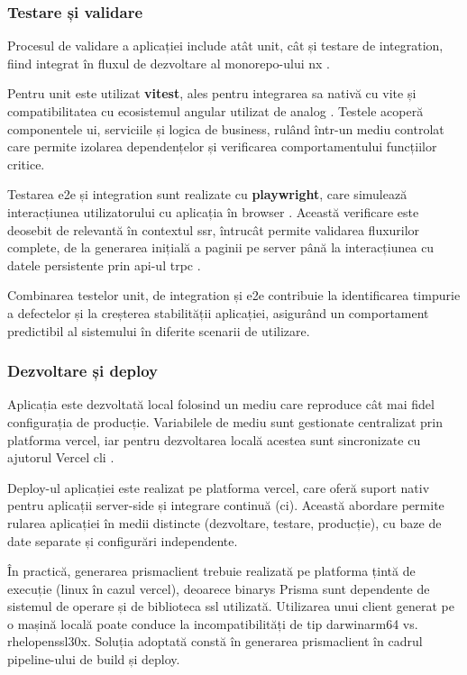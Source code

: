 \subsubsection{Testare și validare}

Procesul de validare a aplicației include atât \gls{unit}, cât și testare de \gls{integration}, fiind integrat în fluxul de dezvoltare al \gls{monorepo}-ului \gls{nx} \cite{nx}.

Pentru \gls{unit} este utilizat \textbf{\gls{vitest}}, ales pentru integrarea sa nativă cu \gls{vite} și compatibilitatea cu ecosistemul \gls{angular} utilizat de \gls{analog} \cite{vitest,vite,analog}.
Testele acoperă componentele \acrshort{ui}, serviciile și logica de business, rulând într-un mediu controlat care permite izolarea dependențelor și verificarea comportamentului funcțiilor critice.

Testarea \gls{e2e} și \gls{integration} sunt realizate cu \textbf{\gls{playwright}}, care simulează interacțiunea utilizatorului cu aplicația în browser \cite{playwright}.
Această verificare este deosebit de relevantă în contextul \acrfull{ssr}, întrucât permite validarea fluxurilor complete, de la generarea inițială a paginii pe server până la interacțiunea cu datele persistente prin \acrshort{api}-ul \acrshort{trpc} \cite{analog,trpc}.

Combinarea testelor \gls{unit}, de \gls{integration} și \gls{e2e} contribuie la identificarea timpurie a defectelor și la creșterea stabilității aplicației, asigurând un comportament predictibil al sistemului în diferite scenarii de utilizare.

\subsubsection{Dezvoltare și deploy}

Aplicația este dezvoltată local folosind un mediu care reproduce cât mai fidel configurația de producție.
Variabilele de mediu sunt gestionate centralizat prin platforma \gls{vercel}, iar pentru dezvoltarea locală acestea sunt sincronizate cu ajutorul Vercel \acrshort{cli} \cite{vercel_cli}.

Deploy-ul aplicației este realizat pe platforma \gls{vercel}, care oferă suport nativ pentru aplicații server-side și integrare continuă (\acrshort{ci}).
Această abordare permite rularea aplicației în medii distincte (dezvoltare, testare, producție), cu baze de date separate și configurări independente.

În practică, generarea \gls{prismaclient} trebuie realizată pe platforma țintă de execuție (\gls{linux} în cazul \gls{vercel}), deoarece \glspl{binary} Prisma sunt dependente de sistemul de operare și de biblioteca \acrshort{ssl} utilizată.
Utilizarea unui client generat pe o mașină locală poate conduce la incompatibilități de tip \gls{darwinarm64} vs. \gls{rhelopenssl30x}.
Soluția adoptată constă în generarea \gls{prismaclient} în cadrul pipeline-ului de build și deploy.

